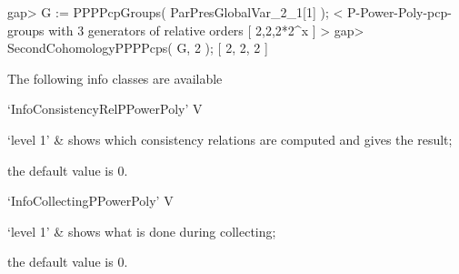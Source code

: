 \beginexample
gap> G := PPPPcpGroups( ParPresGlobalVar_2_1[1] );
< P-Power-Poly-pcp-groups with 3 generators of relative orders [ 2,2,2*2^x ] >
gap> SecondCohomologyPPPPcps( G, 2 );
[ 2, 2, 2 ]
\endexample


The following info classes are available

\>`InfoConsistencyRelPPowerPoly' V

\beginitems
`level 1' & shows which consistency relations are computed and gives the 
result;
\enditems

the default value is 0.

\>`InfoCollectingPPowerPoly' V

\beginitems
`level 1' & shows what is done during collecting;
\enditems

the default value is 0.
